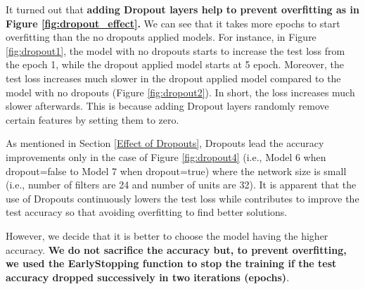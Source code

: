 \documentclass[11pt]{article}
\begin{document}
%
It turned out that \textbf{adding Dropout layers help to prevent overfitting as in Figure \ref{fig:dropout_effect}.}
%
%
We can see that it takes more epochs to start overfitting than the no dropouts applied models.
%
For instance, in Figure \ref{fig:dropout1}, 
the model with no dropouts starts to increase the test loss from the epoch 1, while the dropout applied model starts at 5 epoch.
%
Moreover, the test loss increases much slower in the dropout applied model compared to the model with no dropouts (Figure \ref{fig:dropout2}). In short, the loss increases much slower afterwards.
%
This is because adding Dropout layers randomly remove certain features by setting them to zero.

%
As mentioned in Section \ref{Effect of Dropouts}, Dropouts lead the accuracy improvements only in the case of Figure \ref{fig:dropout4} (i.e., Model 6 when dropout=false to Model 7 when dropout=true) where the network size is small (i.e., number of filters are 24 and number of units are 32). 
%
It is apparent that the use of Dropouts continuously lowers the test loss while contributes to improve the test accuracy so that avoiding overfitting to find better solutions.


However, we decide that it is better to choose the model having the higher accuracy. 
\textbf{We do not sacrifice the accuracy but, to prevent overfitting, we used the EarlyStopping function to stop the training if the test accuracy dropped successively in two iterations (epochs)}.
\end{document}
